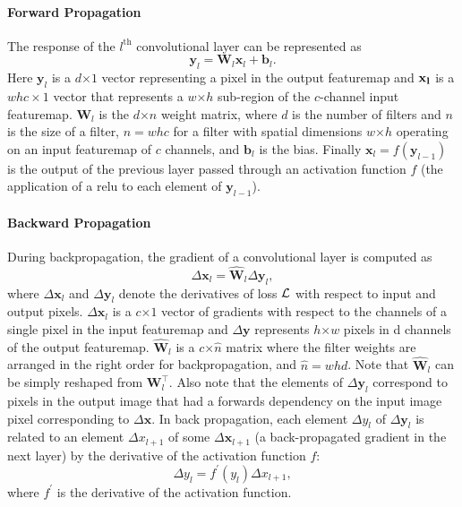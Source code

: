 \documentclass[thesis]{subfiles}
\begin{document}
    \paragraph{Forward Propagation}
    The response of the $l^\text{th}$ convolutional layer can be represented as
    \begin{equation}
    \mathbf{y}_l =\mathbf{W}_l \mathbf{x}_l + \mathbf{b}_l.
    \end{equation}
    Here $\mathbf{y}_l$ is a $d$$\times$$1$ vector representing a pixel in the output \gls{featuremap} and $\bf x_l$ is a $ w h c \times 1$ vector that represents a $w$$\times$$h$ sub-region of the $c$-channel input \gls{featuremap}. $\mathbf{W}_l$ is the $d$$\times$$n$ weight matrix, where $d$ is the number of filters and $n$ is the size of a filter, \ie $n = w h c$ for a filter with spatial dimensions $w$$\times$$h$ operating on an input \gls{featuremap} of $c$ channels, and $\mathbf{b}_l$ is the bias. Finally $\mathbf{x}_l = f(\mathbf{y}_{l-1})$ is the output of the previous layer passed through an activation function $f$ (\eg the application of a \gls{relu} to each element of $\mathbf{y}_{l-1}$).
    
    \paragraph{Backward Propagation}
    During backpropagation, the gradient of a convolutional layer is computed as
    \begin{equation}
    \Delta \mathbf{x}_l = \hat{\mathbf{W}}_l \Delta \mathbf{y}_l,
    \label{eq:back_prop_gradient}
    \end{equation}
    where $\Delta \mathbf{x}_l$ and $\Delta \mathbf{y}_l$ denote the derivatives of loss $\cal L$ with respect to input and output pixels. $\Delta \mathbf{x}_l$ is a $c$$\times$$1$ vector of gradients with respect to the channels of a single pixel in the input \gls{featuremap} and $\Delta \mathbf{y}$ represents $h$$\times$$w$ pixels in d channels of the output \gls{featuremap}. $\hat{\mathbf{W}}_l$ is a $c$$\times$$\hat{n}$ matrix where the filter weights are arranged in the right order for backpropagation, and $\hat{n} = whd$. Note that $\hat{\mathbf{W}}_l$ can be simply reshaped from $\mathbf{W}_l^\top$. Also note that the elements of $\Delta \mathbf{y}_l$ correspond to pixels in the output image that had a forwards dependency on the input image pixel corresponding to $\Delta \mathbf{x}$. In back propagation, each element $\Delta y_l$ of $\Delta \mathbf{y}_l$ is related to an element $\Delta x_{l+1}$ of some $\Delta \mathbf{x}_{l+1}$ (\ie a back-propagated gradient in the next layer) by the derivative of the activation function $f$:
    \begin{equation}
    \Delta y_l = f^\prime (y_l) \Delta x_{l+1},
    \end{equation}
    where $f^\prime$ is the derivative of the activation function. 
    
\end{document}
